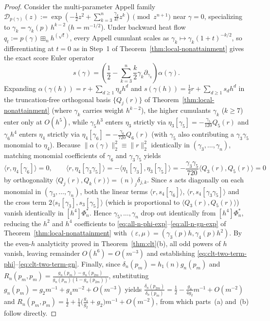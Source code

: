 \documentclass[11pt,a4paper]{article}
\theoremstyle{definition}
\newcommand{\boxplusn}{\boxplus_n}
\begin{document}
\begin{proof}
Consider the multi-parameter Appell family $\mathcal{D}_{p(\gamma)}(z) := \exp(-\frac{1}{2}z^2 + \sum_{k=3}^n \frac{\gamma_k}{k!} z^k) \pmod{z^{n+1}}$ near $\gamma = 0$, specializing to $\gamma_k = \gamma_k(p)\,h^{k-2}$ ($h = m^{-1/2}$). Under backward heat flow $q_t := p(\gamma) \boxplusn h^{(\sqrt{t})}$, every Appell cumulant scales as $\gamma_k \mapsto \gamma_k (1+t)^{-k/2}$, so differentiating at $t = 0$ as in Step~1 of Theorem~\ref{thm:local-nonattainment} gives the exact score Euler operator
\[
s(\gamma) = \left(\frac{1}{2} - \sum_{k=3}^n \frac{k}{2}\gamma_k\partial_{\gamma_k}\right)\alpha(\gamma).
\]
Expanding $\alpha(\gamma(h)) = r + \sum_{d \ge 1} \eta_d h^d$ and $s(\gamma(h)) = \frac{1}{2}r + \sum_{d \ge 1} s_d h^d$ in the truncation-free orthogonal basis $\{Q_j(r)\}$ of Theorem~\ref{thm:local-nonattainment} (where $\gamma_k$ carries weight $h^{k-2}$), the higher cumulants $\gamma_k$ ($k \ge 7$) enter only at $O(h^5)$, while $\gamma_5 h^3$ enters $\eta_3$ strictly via $\eta_3[\gamma_5] = -\frac{\gamma_5}{120}Q_5(r)$ and $\gamma_6 h^4$ enters $\eta_4$ strictly via $\eta_4[\gamma_6] = -\frac{\gamma_6}{720}Q_6(r)$ (with $\gamma_5$ also contributing a $\gamma_3\gamma_5$ monomial to $\eta_4$). Because $\|\alpha(\gamma)\|_2^2 \equiv \|r\|_2^2$ identically in $(\gamma_3, \dots, \gamma_n)$, matching monomial coefficients of $\gamma_6$ and $\gamma_3\gamma_5$ yields
\[
\langle r, \eta_4[\gamma_6]\rangle = 0, \qquad
\langle r, \eta_4[\gamma_3\gamma_5]\rangle = -\langle \eta_1[\gamma_3], \eta_3[\gamma_5]\rangle = -\frac{\gamma_3\gamma_5}{720}\langle Q_3(r), Q_5(r)\rangle = 0
\]
by orthogonality $\langle Q_j(r), Q_k(r)\rangle = (n)_j\delta_{j,k}$. Since $s$ acts diagonally on each monomial in $(\gamma_3,\dots,\gamma_n)$, both the linear terms $\langle r, s_4[\gamma_6]\rangle$, $\langle r, s_4[\gamma_3\gamma_5]\rangle$ and the cross term $2\langle s_1[\gamma_3], s_3[\gamma_5]\rangle$ (which is proportional to $\langle Q_3(r), Q_5(r)\rangle$) vanish identically in $[h^4]\Phi_n^*$. Hence $\gamma_5, \dots, \gamma_n$ drop out identically from $[h^4]\Phi_n^*$, reducing the $h^2$ and $h^4$ coefficients to \eqref{eq:all-n-phi-exp}--\eqref{eq:all-n-gn-exp} of Theorem~\ref{thm:local-nonattainment} with $(\varepsilon, \mu) = (\gamma_3(p) h, \gamma_4(p) h^2)$. By the even-$h$ analyticity proved in Theorem~\ref{thm:clt}(b), all odd powers of $h$ vanish, leaving remainder $O(h^6) = O(m^{-3})$ and establishing \eqref{eq:clt-two-term-phi}--\eqref{eq:clt-two-term-gn}. Finally, since $\delta_n(p_m) = h_1(n) g_n(p_m)$ and $R_n(p_m, p_m) = \frac{g_n(p_m) - g_n(p_{2m})}{g_n(p_m)(1 - g_n(p_{2m}))}$, substituting $g_n(p_m) = g_2 m^{-1} + g_4 m^{-2} + O(m^{-3})$ yields $\frac{\delta_n(p_{2m})}{\delta_n(p_m)} = \frac{1}{2} - \frac{g_4}{4 g_2} m^{-1} + O(m^{-2})$ and $R_n(p_m, p_m) = \frac{1}{2} + \frac{1}{4}\bigl(\frac{g_4}{g_2} + g_2\bigr) m^{-1} + O(m^{-2})$, from which parts~(a) and~(b) follow directly.
\end{proof}
\end{document}
